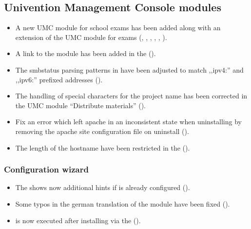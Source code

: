 \subsection{Univention Management Console modules}
\begin{itemize}
\item A new UMC module for school exams has been added along with an extension
  of the UMC  module for exams (,
  , , , , ).
\item A link to the  module has been added in the  ().
\item The smbstatus parsing patterns in  have been adjusted to match ,,ipv4:'' and ,,ipv6:'' prefixed addresses ().
\item The handling of special characters for the project name has been corrected in the UMC module ``Distribute materials'' ().
\item Fix an error which left apache in an inconsistent state when uninstalling  by removing the  apache site configuration file on uninstall ().
\item The length of the hostname have been restricted in the  ().
\end{itemize}

\subsubsection{Configuration wizard}
\begin{itemize}
\item The  shows now additional hints if  is already configured ().
\item Some typos in the german translation of the  module have been fixed ().
\item {} is now executed after installing  via the  ().
\end{itemize}

